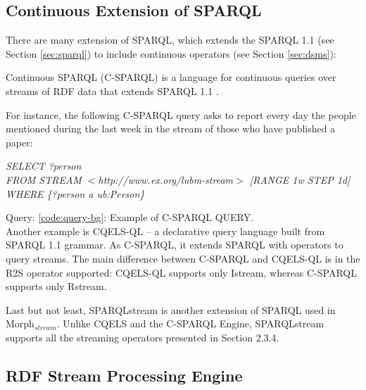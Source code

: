 \subsection{Continuous Extension of SPARQL}\label{sec:continuous-sparql}

There are many extension of SPARQL, which extends the SPARQL 1.1 (see Section \ref{sec:sparql}) to include continuous operators (see Section \ref{sec:dsms}):

Continuous SPARQL (C-SPARQL)  is a language for continuous queries over streams of RDF data that extends SPARQL 1.1 \cite{Barbieri:2010:QRS:1860702.1860705}.

For instance, the following C-SPARQL query asks to report every day the people mentioned during the last week in the stream of those who have published a paper:

\begin{center}
\raggedright
\textit{SELECT ?person}\\
\textit{FROM STREAM $<$http://www.ex.org/lubm-stream$>$ [RANGE 1w STEP 1d]}\\
\textit{WHERE \{?person a ub:Person\}}\\
\label{code:query-bg}
\end{center}
Query: \ref{code:query-bg}: Example of C-SPARQL QUERY.\\

Another example is CQELS-QL \cite{Lephuoc2011} – a declarative query language built from SPARQL 1.1 grammar. As C-SPARQL, it extends SPARQL with operators to query streams. The main difference between C-SPARQL and CQELS-QL is in the R2S operator supported: CQELS-QL supports only Istream, whereas C-SPARQL supports only Rstream. 

Last but not least, SPARQLstream \cite{Calbimonte:2010:EOA:1940281.1940289} is another extension of SPARQL used in Morph$_{stream}$. Unlike CQELS and the C-SPARQL Engine, SPARQLstream supports all the streaming operators presented in Section 2.3.4. 

\subsection{RDF Stream Processing Engine}\label{sec:rspengine}

